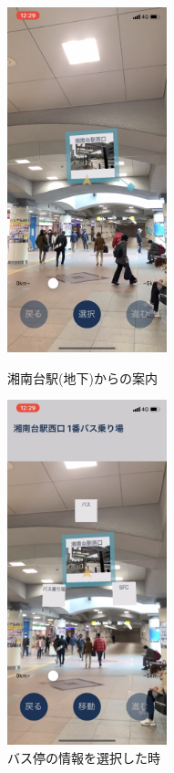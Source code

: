 \begin{figure}[h]
  \begin{minipage}{0.5\hsize}
    \centering
    \includegraphics[height=100mm]{images/shonandai_bus_exit1.png}
    \caption{湘南台駅(地下)からの案内} \label{fig:shonandai_bus_exit1}
  \end{minipage}
  \begin{minipage}{0.5\hsize}
    \centering
    \includegraphics[height=100mm]{images/shonandai_bus_exit_selected.png}
    \caption{バス停の情報を選択した時} \label{fig:shonandai_bus_exit_selected}
  \end{minipage}
\end{figure}

